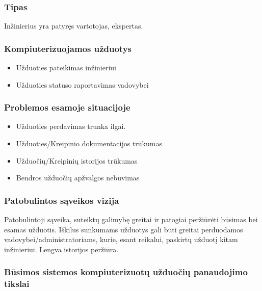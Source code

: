 		\subsubsection{Tipas}
		
		Inžinierius yra patyręs vartotojas, ekspertas.		
		
		\subsubsection{Kompiuterizuojamos užduotys}
		
		\begin{itemize}
			\item Užduoties pateikimas inžinieriui
			\item Užduoties statuso raportavimas vadovybei
		\end{itemize}
		
		\subsubsection{Problemos esamoje situacijoje}
		
		\begin{itemize}
			\item Užduoties perdavimas trunka ilgai.
			\item Užduoties/Kreipinio dokumentacijos trūkumas
			\item Užduočių/Kreipinių istorijos trūkumas
			\item Bendros užduočių apžvalgos nebuvimas 
		\end{itemize}
		
		\subsubsection{Patobulintos sąveikos vizija}
		
		Patobulintoji sąveika, suteiktų galimybę greitai ir patogiai peržiūrėti būsimas bei esamas užduotis.
		Iškilus sunkumams užduotys gali būti greitai perduodamos vadovybei/administratoriams, kurie, esant reikalui, paskirtų užduotį kitam inžinieriui.
		Lengva istorijos peržiūra.
		
		\subsubsection{Būsimos sistemos kompiuterizuotų užduočių panaudojimo tikslai}

